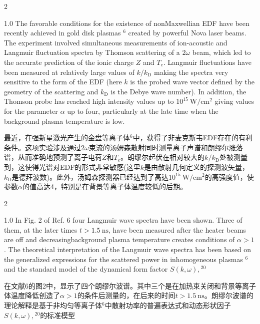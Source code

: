 \documentclass[oneside,onecolumn]{article}
\newcommand\enzhbox[2]{
	\quad\par \begin{paracol}{2} 
			\begin{spacing}{1.0}
					\footnotesize  #1
			\end{spacing}
			
		\switchcolumn[1] 
		#2
	\end{paracol} 
}
\begin{document}
\begin{sloppypar}
\enzhbox{  The favorable conditions for the existence of nonMaxwellian EDF have been recently achieved in gold disk plasmas ${ }^{6}$ created by powerful Nova laser beams. The experiment involved simultaneous measurements of ion-acoustic and Langmuir fluctuation spectra by Thomson scattering of a $2 \omega$ beam, which led to the accurate prediction of the ionic charge $Z$ and $T_{e}$. Langmuir fluctuations have been measured at relatively large values of $k / k_{\mathrm{D}}$ making the spectra very sensitive to the form of the EDF (here $k$ is the probed wave vector defined by the geometry of the scattering and $k_{\mathrm{D}}$ is the Debye wave number). In addition, the Thomson probe has reached high intensity values up to $10^{15} \mathrm{~W} / \mathrm{cm}^{2}$ giving values for the parameter $\alpha$ up to four, particularly at the late time when the background plasma temperature is low.
}{
最近，在强新星激光产生的金盘等离子体${ }^{6}$中，获得了非麦克斯韦EDF存在的有利条件。这项实验涉及通过$2 \omega$束流的汤姆森散射同时测量离子声谱和朗缪尔涨落谱，从而准确地预测了离子电荷$Z$和$T_{e}$。朗缪尔起伏在相对较大的$k / k_{\mathrm{D}}$处被测量到，这使得光谱对EDF的形式非常敏感(这里$k$是由散射几何定义的探测波矢量，$k_{\mathrm{D}}$是德拜波数)。此外，汤姆森探测器已经达到了高达$10^{15} \mathrm{~W} / \mathrm{cm}^{2}$的高强度值，使参数$\alpha$的值高达4，特别是在背景等离子体温度较低的后期。
}
  

\enzhbox{  In Fig. 2 of Ref. 6 four Langmuir wave spectra have been shown. Three of them, at the later times $t>1.5 \mathrm{~ns}$, have been measured after the heater beams are off and decreasingbackground plasma temperature creates conditions of $\alpha>1$. The theoretical interpretation of the Langmuir wave spectra has been based on the generalized expressions for the scattered power in inhomogeneous plasmas $^{6}$ and the standard model of the dynamical form factor $S(k, \omega),{ }^{20}$
}{
在文献6的图2中，显示了四个朗缪尔波谱。其中三个是在加热束关闭和背景等离子体温度降低创造了$\alpha>1$的条件后测量的，在后来的时间$t>1.5 \mathrm{~ns}$。朗缪尔波谱的理论解释是基于非均匀等离子体$^{6}$中散射功率的普遍表达式和动态形状因子$S(k, \omega),{ }^{20}$的标准模型
}
  

\end{sloppypar}
\end{document}

